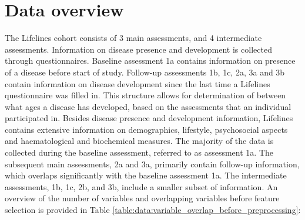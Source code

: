 \section{Data overview}
\label{section:data:data_overview}
The Lifelines cohort consists of 3 main assessments, and 4 intermediate assessments. Information on disease presence and development is collected through questionnaires. Baseline assessment 1a contains information on presence of a disease before start of study. Follow-up assessments 1b, 1c, 2a, 3a and 3b contain information on disease development since the last time a Lifelines questionnaire was filled in. This structure allows for determination of between what ages a disease has developed, based on the assessments that an individual participated in. Besides disease presence and development information, Lifelines contains extensive information on demographics, lifestyle, psychosocial aspects and haematological and biochemical measures. The majority of the data is collected during the baseline assessment, referred to as assessment 1a. The subsequent main assessments, 2a and 3a, primarily contain follow-up information, which overlaps significantly with the baseline assessment 1a. The intermediate assessments, 1b, 1c, 2b, and 3b, include a smaller subset of information. An overview of the number of variables and overlapping variables before feature selection is provided in Table \ref{table:data:variable_overlap_before_preprocessing}: 

